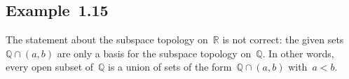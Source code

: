 \subsection{Example~1.15}

The statement about the subspace topology on~$ℝ$ is not correct:
the given sets~$ℚ ∩ (a, b)$ are only a basis for the subspace topology on~$ℚ$.
In other words, every open subset of~$ℚ$ is a union of sets of the form~$ℚ ∩ (a, b)$ with~$a < b$.
